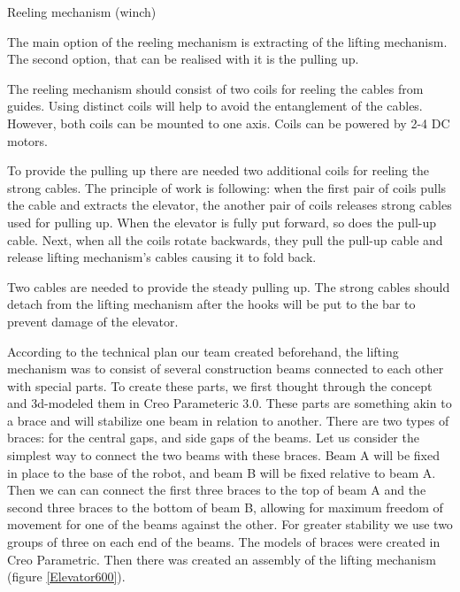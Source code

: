 \begin{enumerate*}
\begin{enumerate*}
\begin{enumerate*}
  	\end{enumerate*}
  	
  	\item Reeling mechanism (winch)
  	\begin{enumerate*}
  		\item The main option of the reeling mechanism is extracting of the lifting mechanism. The second option, that can be realised with it is the pulling up.
  		
  		\item The reeling mechanism should consist of two coils for reeling the cables from guides. Using distinct coils will help to avoid the entanglement of the cables. However, both coils can be mounted to one axis. Coils can be powered by 2-4 DC motors.
  		
  		\item To provide the pulling up there are needed two additional coils for reeling the strong cables. The principle of work is following: when the first pair of coils pulls the cable and extracts the elevator, the another pair of coils releases strong cables used for pulling up. When the elevator is fully put forward, so does the pull-up cable. Next, when all the coils rotate backwards, they pull the pull-up cable and release lifting mechanism's cables causing it to fold back.
  		
  		\item Two cables are needed to provide the steady pulling up. The strong cables should detach from the lifting mechanism after the hooks will be put to the bar to prevent damage of the elevator.
  		
  	\end{enumerate*}
  	
  \end{enumerate*}

  \item According to the technical plan our team created beforehand, the lifting mechanism was to consist of several construction beams connected to each other with special parts. To create these parts, we first thought through the concept and 3d-modeled them in Creo Parameteric 3.0. These parts are something akin to a brace and will stabilize one beam in relation to another. There are two types of braces: for the central gaps, and side gaps of the beams. Let us consider the simplest way to connect the two beams with these braces. Beam A will be fixed in place to the base of the robot, and beam B will be fixed relative to beam A. Then we can can connect the first three braces to the top of beam A and the second three braces to the bottom of beam B, allowing for maximum freedom of movement for one of the beams against the other. For greater stability we use two groups of three on each end of the beams. The models of braces were created in Creo Parametric. Then there was created an assembly of the lifting mechanism (figure \ref{Elevator600}). %
  

\end{enumerate*}
